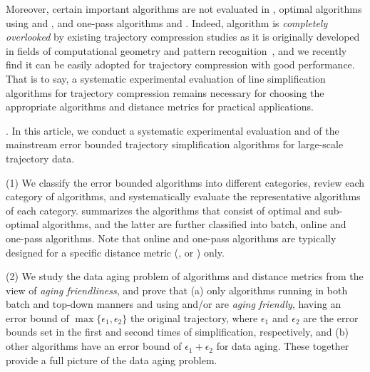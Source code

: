 {{Moreover, certain important algorithms are not evaluated in \cite{Zhang:Evaluation}, \eg optimal algorithms using \ped and \sed, and one-pass algorithms \siped and \cised. Indeed, algorithm \siped is {\em completely overlooked} by existing trajectory compression studies as it is originally developed in fields of computational geometry and pattern recognition~\cite{Williams:Longest,Sklansky:Cone,Dunham:Cone, Zhao:Sleeve}, and we recently find it can be easily adopted for trajectory compression with good performance.} %
%
That is to say, a systematic experimental evaluation of line simplification algorithms for trajectory compression remains necessary for choosing the appropriate algorithms and distance metrics for practical applications.





.
In this article, we conduct a systematic experimental evaluation and  of the mainstream error bounded trajectory simplification algorithms for large-scale trajectory data.

\stab (1) We classify the error bounded \lsa algorithms into different categories, review each category of algorithms, and systematically evaluate the representative algorithms of each category.
%
 summarizes the algorithms that consist of optimal and sub-optimal algorithms, and the latter are further classified into batch, online and one-pass algorithms.
Note that online and one-pass algorithms are typically designed for a specific distance metric  (\ped, \sed or \dad) only.

\stab (2) {We study the data aging problem of \lsa algorithms and distance metrics from the view of \emph{aging friendliness}, and prove that (a) only algorithms running in both batch and top-down manners and using \ped and/or \sed are \emph{aging friendly}, having an error bound of $\max{\{\epsilon_1, \epsilon_2\}}$ \wrt the original trajectory, {where $\epsilon_1$ and $\epsilon_2$ are the error bounds set in the first and second times of simplification, respectively}, and (b) other algorithms have an error bound of ${\epsilon_1+\epsilon_2}$ for data aging. These together provide a full picture of the data aging problem.}

}
